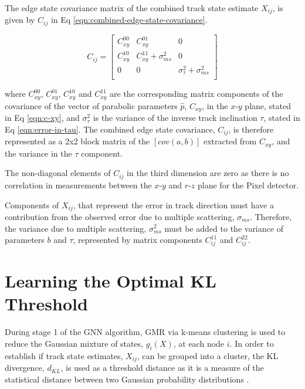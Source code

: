 The edge state covariance matrix of the combined track state estimate $X_{ij}$, is given by $C_{ij}$ in Eq \eqref{eqn:combined-edge-state-covariance}.

\begin{equation}
    C_{ij} = \begin{bmatrix} 
            C_{xy}^{00} & C_{xy}^{01} & 0 \\ 
            C_{xy}^{10} & C_{xy}^{11} + \sigma_{ms}^2 & 0 \\ 
            0 & 0 & \sigma_{\tau}^{2} + \sigma_{ms}^2 \\
            \end{bmatrix} 
    \label{eqn:combined-edge-state-covariance}
\end{equation}

where $C_{xy}^{00}$, $C_{xy}^{01}$, $C_{xy}^{10}$ and $C_{xy}^{11}$ are the corresponding matrix components of the covariance of the vector of parabolic parameters $\hat{p}$, $C_{xy}$, in the $x$-$y$ plane, stated in Eq \eqref{eqn:c-xy}, and $\sigma_{\tau}^2$ is the variance of the inverse track inclination $\tau$, stated in Eq \eqref{eqn:error-in-tau}. The combined edge state covariance, $C_{ij}$, is therefore represented as a 2x2 block matrix of the $[cov(a, b)]$ extracted from $C_{xy}$, and the variance in the $\tau$ component.

The non-diagonal elements of $C_{ij}$ in the third dimension are zero as there is no correlation in measurements between the $x$-$y$ and $r$-$z$ plane for the Pixel detector.

Components of $X_{ij}$, that represent the error in track direction must have a contribution from the observed error due to multiple scattering, $\sigma_{ms}$. Therefore, the variance due to multiple scattering, $\sigma_{ms}^2$ must be added to the variance of parameters $b$ and $\tau$, represented by matrix components $C_{ij}^{11}$ and $C_{ij}^{22}$.




\section{Learning the Optimal KL Threshold}
\label{chapter-6-kl-threshold}

During stage 1 of the GNN algorithm, GMR via k-means clustering is used to reduce the Gaussian mixture of states, $g_i(X)$, at each node $i$. In order to establish if track state estimates, $X_{ij}$, can be grouped into a cluster, the KL divergence, $d_{KL}$, is used as a threshold distance as it is a measure of the statistical distance between two Gaussian probability distributions \cite{KL, FRUHWIRTH19971}.

